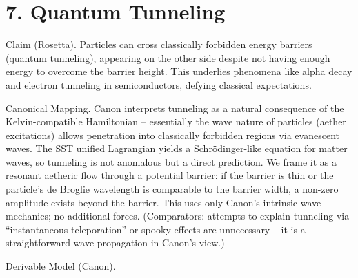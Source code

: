\documentclass[11pt]{article}
\begin{document}
\section*{7. Quantum Tunneling}

Claim (Rosetta). Particles can cross classically forbidden energy barriers (quantum tunneling), appearing on the other side despite not having enough energy to overcome the barrier height. This underlies phenomena like alpha decay and electron tunneling in semiconductors, defying classical expectations.


Canonical Mapping. Canon interprets tunneling as a natural consequence of the Kelvin-compatible Hamiltonian – essentially the wave nature of particles (aether excitations) allows penetration into classically forbidden regions via evanescent waves. The SST unified Lagrangian yields a Schrödinger-like equation for matter waves, so tunneling is not anomalous but a direct prediction. We frame it as a resonant aetheric flow through a potential barrier: if the barrier is thin or the particle’s de Broglie wavelength is comparable to the barrier width, a non-zero amplitude exists beyond the barrier. This uses only Canon’s intrinsic wave mechanics; no additional forces. (Comparators: attempts to explain tunneling via “instantaneous teleporation” or spooky effects are unnecessary – it is a straightforward wave propagation in Canon’s view.)


Derivable Model (Canon).
\end{document}
